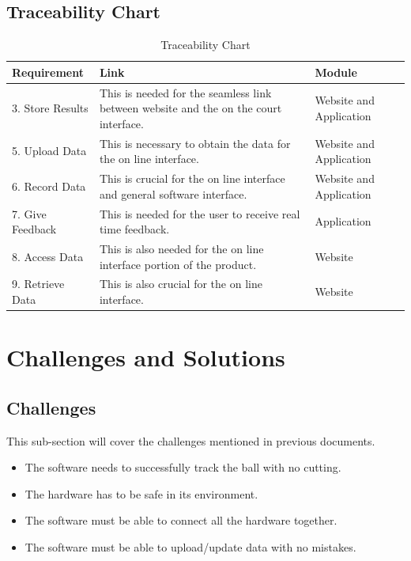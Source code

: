 \subsection{Traceability Chart}
\begin{table}[h!]
  \centering
  \caption{Traceability Chart}
  \label{tab:table6}
  \begin{tabular}{|p{}
                p{}
                p{}|
              }
    \toprule
    Requirement & Link & Module\\
    \midrule
    3. Store Results & This is needed for the seamless link between website and the on the court interface. & Website and Application\\
    \hline
    5. Upload Data & This is necessary to obtain the data for the on line interface. & Website and Application\\
    \hline
    6. Record Data & This is crucial for the on line interface and general software interface. & Website and Application\\
    \hline
    7. Give Feedback & This is needed for the user to receive real time feedback. & Application\\
    \hline
    8. Access Data & This is also needed for the on line interface portion of the product. & Website\\
    \hline
    9. Retrieve Data & This is also crucial for the on line interface. & Website\\
    \bottomrule
  \end{tabular}
\end{table}

\section{Challenges and Solutions}

\subsection{Challenges}
This sub-section will cover the challenges mentioned in previous documents.
\begin{itemize}
    \item The software needs to successfully track the ball with no cutting.
    \item The hardware has to be safe in its environment.
    \item The software must be able to connect all the hardware together.
    \item The software must be able to upload/update data with no mistakes.
\end{itemize}

